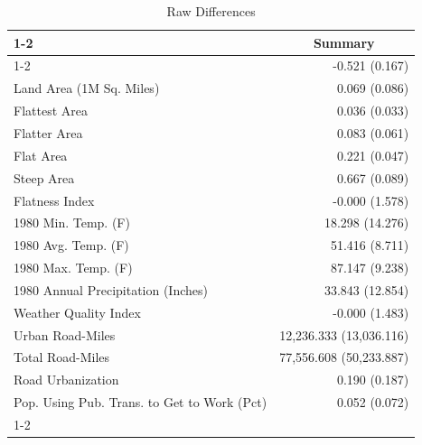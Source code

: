 \begin{table}[!h]
\caption{Raw Differences}
\centering
\begin{tabular}{ll}
\cline{1-2}
\multicolumn{1}{r}{} &
  \multicolumn{1}{c}{Summary} \\
\cline{1-2}
\multicolumn{1}{l}{Elasticity (M2, With Covariates)} &
  \multicolumn{1}{r}{-0.521 (0.167)} \\
\multicolumn{1}{l}{Land Area (1M Sq. Miles)} &
  \multicolumn{1}{r}{0.069 (0.086)} \\
\multicolumn{1}{l}{Flattest Area} &
  \multicolumn{1}{r}{0.036 (0.033)} \\
\multicolumn{1}{l}{Flatter Area} &
  \multicolumn{1}{r}{0.083 (0.061)} \\
\multicolumn{1}{l}{Flat Area} &
  \multicolumn{1}{r}{0.221 (0.047)} \\
\multicolumn{1}{l}{Steep Area} &
  \multicolumn{1}{r}{0.667 (0.089)} \\
\multicolumn{1}{l}{Flatness Index} &
  \multicolumn{1}{r}{-0.000 (1.578)} \\
\multicolumn{1}{l}{1980 Min. Temp. (F)} &
  \multicolumn{1}{r}{18.298 (14.276)} \\
\multicolumn{1}{l}{1980 Avg. Temp. (F)} &
  \multicolumn{1}{r}{51.416 (8.711)} \\
\multicolumn{1}{l}{1980 Max. Temp. (F)} &
  \multicolumn{1}{r}{87.147 (9.238)} \\
\multicolumn{1}{l}{1980 Annual Precipitation (Inches)} &
  \multicolumn{1}{r}{33.843 (12.854)} \\
\multicolumn{1}{l}{Weather Quality Index} &
  \multicolumn{1}{r}{-0.000 (1.483)} \\
\multicolumn{1}{l}{Urban Road-Miles} &
  \multicolumn{1}{r}{12,236.333 (13,036.116)} \\
\multicolumn{1}{l}{Total Road-Miles} &
  \multicolumn{1}{r}{77,556.608 (50,233.887)} \\
\multicolumn{1}{l}{Road Urbanization} &
  \multicolumn{1}{r}{0.190 (0.187)} \\
\multicolumn{1}{l}{Pop. Using Pub. Trans. to Get to Work (Pct)} &
  \multicolumn{1}{r}{0.052 (0.072)} \\
\cline{1-2}
\end{tabular}
\end{table}
